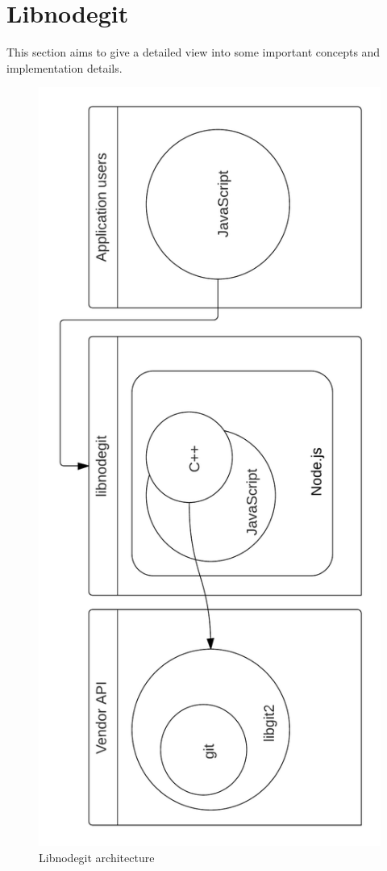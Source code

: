 \chapter{Libnodegit}

This section aims to give a detailed view into some important concepts and
implementation details.

\begin{figure}[htb]
  \centering
  \includegraphics[scale=0.27]{./diagrams/architecture_rotated.png}
  \caption{Libnodegit architecture}
  \label{fig:architecture}
\end{figure}

